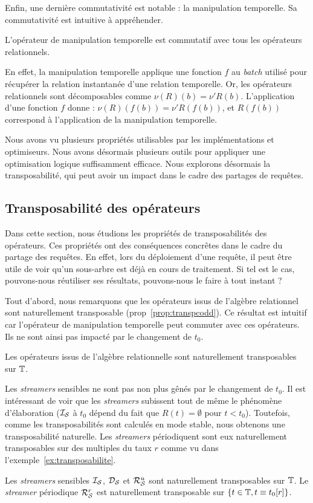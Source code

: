 Enfin, une dernière commutativité est notable : la manipulation temporelle. Sa commutativité est intuitive à appréhender.
\begin{prop}\label{prop:commut:manipulation}
L'opérateur de manipulation temporelle est commutatif avec tous les opérateurs relationnels.
\end{prop}
En effet, la manipulation temporelle applique une fonction $f$ au \textit{batch} utilisé pour récupérer la relation instantanée d'une relation temporelle. Or, les opérateurs relationnels sont décomposables comme $\nu (R)(b) = \nu' R(b)$. L'application d'une fonction $f$ donne : $\nu (R)(f(b)) = \nu' R(f(b))$, et $R(f(b))$ correspond à l'application de la manipulation temporelle.

Nous avons vu plusieurs propriétés utilisables par les implémentations et optimiseurs. Nous avons désormais plusieurs outils pour appliquer une optimisation logique suffisamment efficace. Nous explorons désormais la transposabilité, qui peut avoir un impact dans le cadre des partages de requêtes.

\subsection{Transposabilité des opérateurs}
Dans cette section, nous étudions les propriétés de transposabilités des opérateurs. Ces propriétés ont des conséquences concrêtes dans le cadre du partage des requêtes. En effet, lors du déploiement d'une requête, il peut être utile de voir qu'un sous-arbre est déjà en cours de traitement. Si tel est le cas, pouvons-nous réutiliser ses résultats, pouvons-nous le faire à tout instant ?

Tout d'abord, nous remarquons que les opérateurs issus de l'algèbre relationnel sont naturellement transposable (prop~\ref{prop:transpcodd}). Ce résultat est intuitif car l'opérateur de manipulation temporelle peut commuter avec ces opérateurs. Ils ne sont ainsi pas impacté par le changement de $t_0$.
\begin{prop}\label{prop:transpcodd}
    Les opérateurs issus de l'algèbre relationnelle sont naturellement transposables sur $\mathbb{T}$.
\end{prop}

Les \textit{streamers} sensibles ne sont pas non plus gênés par le changement de $t_0$. Il est intéressant de voir que les \textit{streamers} subissent tout de même le phénomène d'élaboration ($\mathcal{I_S}$ à $t_0$ dépend du fait que $R(t)=\emptyset$ pour $t <t_0$). Toutefois, comme les transposabilités sont calculés en mode stable, nous obtenons une transposabilité naturelle. Les \textit{streamers} périodiquent sont eux naturellement transposables sur des multiples du taux $r$ comme vu dans l'exemple~\ref{ex:transposabilite}.
\begin{prop}
    Les \textit{streamers} sensibles $\mathcal{I_S}$, $\mathcal{D_S}$ et $\mathcal{R}_{\mathcal S}^{u}$ sont naturellement transposables sur $\mathbb{T}$.
    Le \textit{streamer} périodique $\mathcal{R}_{\mathcal S}^{r}$ est naturellement transposable sur $\{t\in \mathbb{T}, t\equiv t_0 [r]\}$.
\end{prop}

